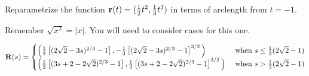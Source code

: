 \begin{question}
Reparametrize the function $\mathbf{r}(t)=(\tfrac12 t^2 , \tfrac13 t^3)$ in terms of arclength from $t=-1$.
\end{question}
\begin{hint}
Remember $\sqrt{x^2}=|x|$. You will need to consider cases for this one.
\end{hint}
\begin{answer}
$\mathbf{R}(s)=\begin{cases}
\Big(\frac12\left[ (2\sqrt2-3s)^{2/3}-1\right],-\frac13\left[(2\sqrt2-3s)^{2/3}-1\right]^{3/2}\Big)&\text{ when }s\le \frac13(2\sqrt2-1)\\
\Big(\frac12\left[(3s+2-2\sqrt2)^{2/3}-1 \right],\frac13\left[(3s+2-2\sqrt2)^{2/3}-1\right]^{3/2}\Big)&\text{ when }s>\frac13(2\sqrt2-1)
\end{cases}
$
\end{answer}
